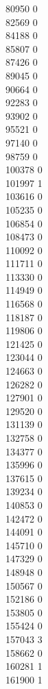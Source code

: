 { 80950	0 \\
 82569	0 \\
 84188	0 \\
 85807	0 \\
 87426	0 \\
 89045	0 \\
 90664	0 \\
 92283	0 \\
 93902	0 \\
 95521	0 \\
 97140	0 \\
 98759	0 \\
 100378	0 \\
 101997	1 \\
 103616	0 \\
 105235	0 \\
 106854	0 \\
 108473	0 \\
 110092	0 \\
 111711	0 \\
 113330	0 \\
 114949	0 \\
 116568	0 \\
 118187	0 \\
 119806	0 \\
 121425	0 \\
 123044	0 \\
 124663	0 \\
 126282	0 \\
 127901	0 \\
 129520	0 \\
 131139	0 \\
 132758	0 \\
 134377	0 \\
 135996	0 \\
 137615	0 \\
 139234	0 \\
 140853	0 \\
 142472	0 \\
 144091	0 \\
 145710	0 \\
 147329	0 \\
 148948	0 \\
 150567	0 \\
 152186	0 \\
 153805	0 \\
 155424	0 \\
 157043	3 \\
 158662	0 \\
 160281	1 \\
 161900	1 \\
}
